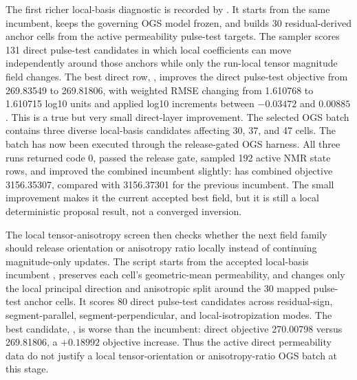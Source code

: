 The first richer local-basis diagnostic is recorded by
.  It starts from the same
 incumbent, keeps the governing OGS model frozen, and
builds 30 residual-derived anchor cells from the active permeability pulse-test
targets.  The sampler scores 131 direct pulse-test candidates in which local
coefficients can move independently around those anchors while only the run-local
 tensor magnitude field changes.  The best direct row,
, improves the direct pulse-test objective from
269.83549 to 269.81806, with weighted RMSE changing from 1.610768 to 1.610715 log10
units and applied log10 increments between \(-0.03472\) and \(0.00885\).  This is a
true but very small direct-layer improvement.  The selected OGS batch contains three
diverse local-basis candidates affecting 30, 37, and 47 cells.  The batch has now
been executed through the release-gated OGS harness.  All three runs returned code 0,
passed the release gate, sampled 192 active NMR state rows, and improved the combined
incumbent slightly:  has combined objective
3156.35307, compared with 3156.37301 for the previous
 incumbent.  The small improvement makes it the
current accepted best field, but it is still a local deterministic proposal result,
not a converged inversion.

The local tensor-anisotropy screen then checks whether the next field family should
release orientation or anisotropy ratio locally instead of continuing magnitude-only
updates.  The script
 starts from the accepted local-basis
incumbent , preserves each cell's
geometric-mean permeability, and changes only the local principal direction and
anisotropic split around the 30 mapped pulse-test anchor cells.  It scores 80 direct
pulse-test candidates across residual-sign, segment-parallel, segment-perpendicular,
and local-isotropization modes.  The best candidate,
, is worse than the incumbent: direct
objective 270.00798 versus 269.81806, a \(+0.18992\) objective increase.  Thus the
active direct permeability data do not justify a local tensor-orientation or
anisotropy-ratio OGS batch at this stage.

